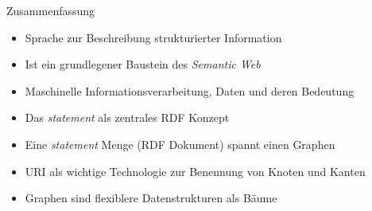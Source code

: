 \documentclass{beamer}
\begin{document}
\begin{frame}{Zusammenfassung}
	
	\begin{itemize}
		\item Sprache zur Beschreibung strukturierter Information
		\item Ist ein grundlegener Baustein des \emph{Semantic Web}
		\item Maschinelle Informationsverarbeitung, Daten und deren Bedeutung
		\item Das \emph{statement} als zentrales RDF Konzept
		\item Eine \emph{statement} Menge (RDF Dokument) spannt einen Graphen
		\item URI als wichtige Technologie zur Benennung von Knoten und Kanten
		\item Graphen sind flexiblere Datenstrukturen als Bäume
	\end{itemize}
	
\end{frame}
\end{document}

